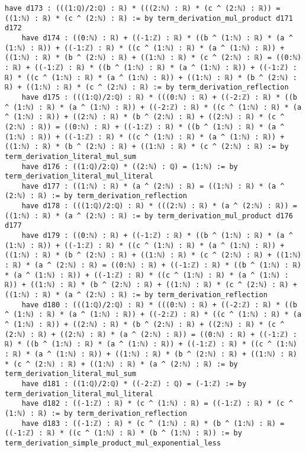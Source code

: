 \documentclass{article}
\begin{document}
\begin{tcolorbox}[colback=white!10, width=\linewidth]
\begin{lstlisting}[language=Lean4]
    have d173 : (((1:ℚ)/2:ℚ) : ℝ) * (((2:ℕ) : ℝ) * (c ^ (2:ℕ) : ℝ)) = ((1:ℕ) : ℝ) * (c ^ (2:ℕ) : ℝ) := by term_derivation_mul_product d171 d172
    have d174 : ((0:ℕ) : ℝ) + ((-1:ℤ) : ℝ) * ((b ^ (1:ℕ) : ℝ) * (a ^ (1:ℕ) : ℝ)) + ((-1:ℤ) : ℝ) * ((c ^ (1:ℕ) : ℝ) * (a ^ (1:ℕ) : ℝ)) + ((1:ℕ) : ℝ) * (b ^ (2:ℕ) : ℝ) + ((1:ℕ) : ℝ) * (c ^ (2:ℕ) : ℝ) = ((0:ℕ) : ℝ) + ((-1:ℤ) : ℝ) * ((b ^ (1:ℕ) : ℝ) * (a ^ (1:ℕ) : ℝ)) + ((-1:ℤ) : ℝ) * ((c ^ (1:ℕ) : ℝ) * (a ^ (1:ℕ) : ℝ)) + ((1:ℕ) : ℝ) * (b ^ (2:ℕ) : ℝ) + ((1:ℕ) : ℝ) * (c ^ (2:ℕ) : ℝ) := by term_derivation_reflection
    have d175 : (((1:ℚ)/2:ℚ) : ℝ) * (((0:ℕ) : ℝ) + ((-2:ℤ) : ℝ) * ((b ^ (1:ℕ) : ℝ) * (a ^ (1:ℕ) : ℝ)) + ((-2:ℤ) : ℝ) * ((c ^ (1:ℕ) : ℝ) * (a ^ (1:ℕ) : ℝ)) + ((2:ℕ) : ℝ) * (b ^ (2:ℕ) : ℝ) + ((2:ℕ) : ℝ) * (c ^ (2:ℕ) : ℝ)) = ((0:ℕ) : ℝ) + ((-1:ℤ) : ℝ) * ((b ^ (1:ℕ) : ℝ) * (a ^ (1:ℕ) : ℝ)) + ((-1:ℤ) : ℝ) * ((c ^ (1:ℕ) : ℝ) * (a ^ (1:ℕ) : ℝ)) + ((1:ℕ) : ℝ) * (b ^ (2:ℕ) : ℝ) + ((1:ℕ) : ℝ) * (c ^ (2:ℕ) : ℝ) := by term_derivation_literal_mul_sum
    have d176 : ((1:ℚ)/2:ℚ) * ((2:ℕ) : ℚ) = (1:ℕ) := by term_derivation_literal_mul_literal
    have d177 : ((1:ℕ) : ℝ) * (a ^ (2:ℕ) : ℝ) = ((1:ℕ) : ℝ) * (a ^ (2:ℕ) : ℝ) := by term_derivation_reflection
    have d178 : (((1:ℚ)/2:ℚ) : ℝ) * (((2:ℕ) : ℝ) * (a ^ (2:ℕ) : ℝ)) = ((1:ℕ) : ℝ) * (a ^ (2:ℕ) : ℝ) := by term_derivation_mul_product d176 d177
    have d179 : ((0:ℕ) : ℝ) + ((-1:ℤ) : ℝ) * ((b ^ (1:ℕ) : ℝ) * (a ^ (1:ℕ) : ℝ)) + ((-1:ℤ) : ℝ) * ((c ^ (1:ℕ) : ℝ) * (a ^ (1:ℕ) : ℝ)) + ((1:ℕ) : ℝ) * (b ^ (2:ℕ) : ℝ) + ((1:ℕ) : ℝ) * (c ^ (2:ℕ) : ℝ) + ((1:ℕ) : ℝ) * (a ^ (2:ℕ) : ℝ) = ((0:ℕ) : ℝ) + ((-1:ℤ) : ℝ) * ((b ^ (1:ℕ) : ℝ) * (a ^ (1:ℕ) : ℝ)) + ((-1:ℤ) : ℝ) * ((c ^ (1:ℕ) : ℝ) * (a ^ (1:ℕ) : ℝ)) + ((1:ℕ) : ℝ) * (b ^ (2:ℕ) : ℝ) + ((1:ℕ) : ℝ) * (c ^ (2:ℕ) : ℝ) + ((1:ℕ) : ℝ) * (a ^ (2:ℕ) : ℝ) := by term_derivation_reflection
    have d180 : (((1:ℚ)/2:ℚ) : ℝ) * (((0:ℕ) : ℝ) + ((-2:ℤ) : ℝ) * ((b ^ (1:ℕ) : ℝ) * (a ^ (1:ℕ) : ℝ)) + ((-2:ℤ) : ℝ) * ((c ^ (1:ℕ) : ℝ) * (a ^ (1:ℕ) : ℝ)) + ((2:ℕ) : ℝ) * (b ^ (2:ℕ) : ℝ) + ((2:ℕ) : ℝ) * (c ^ (2:ℕ) : ℝ) + ((2:ℕ) : ℝ) * (a ^ (2:ℕ) : ℝ)) = ((0:ℕ) : ℝ) + ((-1:ℤ) : ℝ) * ((b ^ (1:ℕ) : ℝ) * (a ^ (1:ℕ) : ℝ)) + ((-1:ℤ) : ℝ) * ((c ^ (1:ℕ) : ℝ) * (a ^ (1:ℕ) : ℝ)) + ((1:ℕ) : ℝ) * (b ^ (2:ℕ) : ℝ) + ((1:ℕ) : ℝ) * (c ^ (2:ℕ) : ℝ) + ((1:ℕ) : ℝ) * (a ^ (2:ℕ) : ℝ) := by term_derivation_literal_mul_sum
    have d181 : ((1:ℚ)/2:ℚ) * ((-2:ℤ) : ℚ) = (-1:ℤ) := by term_derivation_literal_mul_literal
    have d182 : ((-1:ℤ) : ℝ) * (c ^ (1:ℕ) : ℝ) = ((-1:ℤ) : ℝ) * (c ^ (1:ℕ) : ℝ) := by term_derivation_reflection
    have d183 : ((-1:ℤ) : ℝ) * (c ^ (1:ℕ) : ℝ) * (b ^ (1:ℕ) : ℝ) = ((-1:ℤ) : ℝ) * ((c ^ (1:ℕ) : ℝ) * (b ^ (1:ℕ) : ℝ)) := by term_derivation_simple_product_mul_exponential_less

\end{lstlisting}
\end{tcolorbox}
\end{document}
